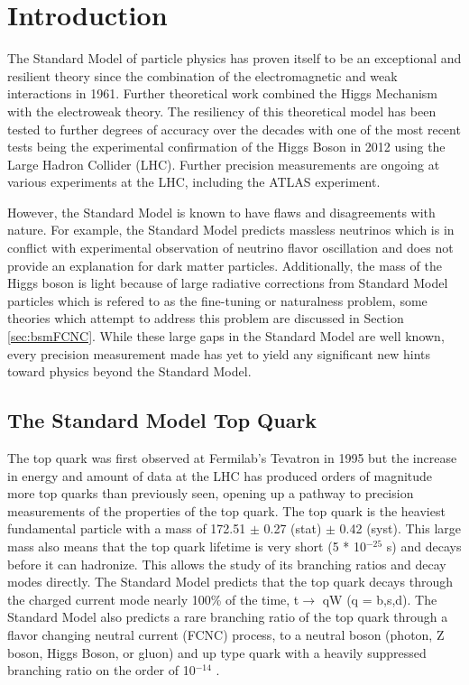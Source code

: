 \chapter{Introduction}
\label{ch:Introduction}



The Standard Model of particle physics has proven itself to be an exceptional and resilient theory since the combination of the electromagnetic and weak interactions in 1961\cite{SM1Glashow}.  Further theoretical work combined the Higgs Mechanism\cite{Higgs1,Higgs2} with the electroweak theory\cite{SM2Weinberg, SM3Salam}.  The resiliency of this theoretical model has been tested to further degrees of accuracy over the decades with one of the most recent tests being the experimental confirmation of the Higgs Boson in 2012\cite{Higgs3,Higgs4} using the Large Hadron Collider (LHC).  Further precision measurements are ongoing at various experiments at the LHC, including the ATLAS experiment.

However, the Standard Model is known to have flaws and disagreements with nature.  For example, the Standard Model predicts massless neutrinos which is in conflict with experimental observation of neutrino flavor oscillation and does not provide an explanation for dark matter particles. Additionally, the mass of the Higgs boson is light because of large radiative corrections from Standard Model particles which is refered to as the fine-tuning or naturalness problem, some theories which attempt to address this problem are discussed in Section \ref{sec:bsmFCNC}.  While these large gaps in the Standard Model are well known, every precision measurement made has yet to yield any significant new hints toward physics beyond the Standard Model.  

\section{The Standard Model Top Quark}
The top quark was first observed at Fermilab's Tevatron in 1995\cite{TopObs} but the increase in energy and amount of data at the LHC has produced orders of magnitude more top quarks than previously seen, opening up a pathway to precision measurements of the properties of the top quark.  The top quark is the heaviest fundamental particle with a mass of 172.51 $\pm$ 0.27 (stat) $\pm$ 0.42 (syst)\cite{TopMass2017}.  This large mass also means that the top quark lifetime is very short (5 * 10$^{-25}$ s) and decays before it can hadronize.  This allows the study of its branching ratios and decay modes directly.  The Standard Model predicts that the top quark decays through the charged current mode nearly 100\% of the time, t$\rightarrow$ qW (q = b,s,d)\cite{PDG2018}.   The Standard Model also predicts a rare branching ratio of the top quark through a flavor changing neutral current (FCNC) process, to a neutral boson (photon, Z boson, Higgs Boson, or gluon) and up type quark with a heavily suppressed branching ratio on the order of 10$^{-14}$ \cite{2HDM-2}.

